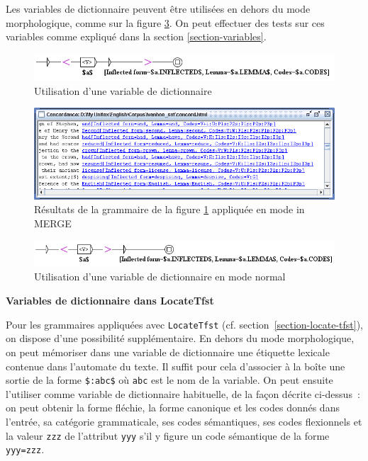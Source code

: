 \noindent Les variables de dictionnaire peuvent être utilisées en dehors du mode morphologique,
comme sur la figure \ref{fig-morpho7}. On peut effectuer des tests sur ces variables comme expliqué
dans la section \ref{section-variables}.

\begin{figure}[!ht]
\begin{center}
\includegraphics[width=16cm]{resources/img/fig6-17o.png}
\caption{Utilisation d'une variable de dictionnaire\label{fig-morpho5}}
\end{center}
\end{figure}

\begin{figure}[!ht]
\begin{center}
\includegraphics[width=15cm]{resources/img/fig6-17p.png}
\caption{Résultats de la  grammaire de la figure \ref{fig-morpho5} appliquée en mode in MERGE
\label{fig-morpho6}}
\end{center}
\end{figure}

\begin{figure}[!ht]
\begin{center}
\includegraphics[width=15.5cm]{resources/img/fig6-17q.png}
\caption{Utilisation d'une variable de dictionnaire en mode normal\label{fig-morpho7}}
\end{center}
\end{figure}


\bigskip
\noindent \textbf{Variables de dictionnaire dans LocateTfst}

\noindent Pour les grammaires appliquées avec \verb+LocateTfst+ (cf. section~\ref{section-locate-tfst}), on dispose d'une possibilité
supplémentaire. 
En dehors du mode morphologique, on peut mémoriser dans une variable de dictionnaire
une étiquette lexicale contenue dans l'automate du texte.
Il suffit pour cela d'associer à la boîte une sortie de la forme \verb+$:abc$+ où \verb+abc+
est le nom de la variable.
On peut ensuite l'utiliser comme variable de dictionnaire habituelle, de la façon décrite ci-dessus~:
on peut obtenir la forme fléchie, la forme canonique et les codes donnés dans l'entrée, sa
catégorie grammaticale, ses codes sémantiques, ses codes flexionnels et la valeur
 \verb+zzz+ de l'attribut \verb+yyy+ s'il y figure un  code sémantique de la forme \verb+yyy=zzz+.


